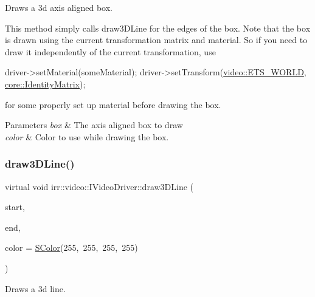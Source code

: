 Draws a 3d axis aligned box. 

This method simply calls draw3\+D\+Line for the edges of the box. Note that the box is drawn using the current transformation matrix and material. So if you need to draw it independently of the current transformation, use 
\begin{DoxyCode}
driver->setMaterial(someMaterial);
driver->setTransform(\hyperlink{namespaceirr_1_1video_a15b57657a320243be03ae6f66fcff43da843cf42adb3fa9caf61c9e228cf14e85}{video::ETS\_WORLD}, \hyperlink{namespaceirr_1_1core_ac4561f3920d3fbfbfff74c9bed1f2713}{core::IdentityMatrix});
\end{DoxyCode}
 for some properly set up material before drawing the box. 
\begin{DoxyParams}{Parameters}
{\em box} & The axis aligned box to draw \\
\hline
{\em color} & Color to use while drawing the box. \\
\hline
\end{DoxyParams}
\mbox{\label{classirr_1_1video_1_1IVideoDriver_a5e4e03dca1720f3d2019b73a4eebb5e6}} 
\subsubsection{\texorpdfstring{draw3\+D\+Line()}{draw3DLine()}}
{\footnotesize\ttfamily virtual void irr\+::video\+::\+I\+Video\+Driver\+::draw3\+D\+Line (\begin{DoxyParamCaption}\item[{const \hyperlink{namespaceirr_1_1core_a06f169d08b5c429f5575acb7edbad811}{core\+::vector3df} \&}]{start,  }\item[{const \hyperlink{namespaceirr_1_1core_a06f169d08b5c429f5575acb7edbad811}{core\+::vector3df} \&}]{end,  }\item[{\hyperlink{classirr_1_1video_1_1SColor}{S\+Color}}]{color = {\ttfamily \hyperlink{classirr_1_1video_1_1SColor}{S\+Color}(255,~255,~255,~255)} }\end{DoxyParamCaption})\hspace{0.3cm}{\ttfamily [pure virtual]}}



Draws a 3d line. 


